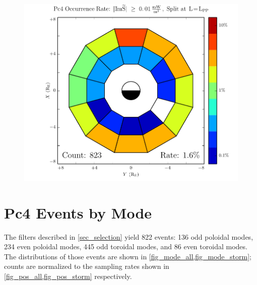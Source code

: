 \begin{figure}[!htb]
    \centering
    \includegraphics[width=\textwidth]{figures/rate_all_lpp.pdf}
    \caption[Pc4 Rate Inside and Outside the Plasmapause]{
    }
    \label{fig_rate_all_lpp}
\end{figure}

\section{Pc4 Events by Mode}
  \label{sec_mode}

The filters described in \cref{sec_selection} yield 822 events: 136 odd poloidal modes, 234 even poloidal modes, 445 odd toroidal modes, and 86 even toroidal modes. The distributions of those events are shown in \cref{fig_mode_all,fig_mode_storm}; counts are normalized to the sampling rates shown in \cref{fig_pos_all,fig_pos_storm} respectively. 




